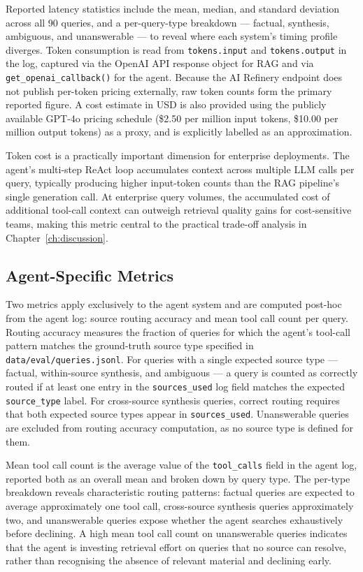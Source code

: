 Reported latency statistics include the mean, median, and standard deviation across all 90 queries, and a per-query-type breakdown — factual, synthesis, ambiguous, and unanswerable — to reveal where each system's timing profile diverges. Token consumption is read from \texttt{tokens.input} and \texttt{tokens.output} in the log, captured via the OpenAI API response object for RAG and via \texttt{get\_openai\_callback()} for the agent. Because the AI Refinery endpoint does not publish per-token pricing externally, raw token counts form the primary reported figure. A cost estimate in USD is also provided using the publicly available GPT-4o pricing schedule (\$2.50 per million input tokens, \$10.00 per million output tokens) as a proxy, and is explicitly labelled as an approximation.

Token cost is a practically important dimension for enterprise deployments. The agent's multi-step ReAct loop accumulates context across multiple LLM calls per query, typically producing higher input-token counts than the RAG pipeline's single generation call. At enterprise query volumes, the accumulated cost of additional tool-call context can outweigh retrieval quality gains for cost-sensitive teams, making this metric central to the practical trade-off analysis in Chapter~\ref{ch:discussion}.

\subsection{Agent-Specific Metrics}

Two metrics apply exclusively to the agent system and are computed post-hoc from the agent log: source routing accuracy and mean tool call count per query. Routing accuracy measures the fraction of queries for which the agent's tool-call pattern matches the ground-truth source type specified in \texttt{data/eval/queries.jsonl}. For queries with a single expected source type — factual, within-source synthesis, and ambiguous — a query is counted as correctly routed if at least one entry in the \texttt{sources\_used} log field matches the expected \texttt{source\_type} label. For cross-source synthesis queries, correct routing requires that both expected source types appear in \texttt{sources\_used}. Unanswerable queries are excluded from routing accuracy computation, as no source type is defined for them.

Mean tool call count is the average value of the \texttt{tool\_calls} field in the agent log, reported both as an overall mean and broken down by query type. The per-type breakdown reveals characteristic routing patterns: factual queries are expected to average approximately one tool call, cross-source synthesis queries approximately two, and unanswerable queries expose whether the agent searches exhaustively before declining. A high mean tool call count on unanswerable queries indicates that the agent is investing retrieval effort on queries that no source can resolve, rather than recognising the absence of relevant material and declining early.

